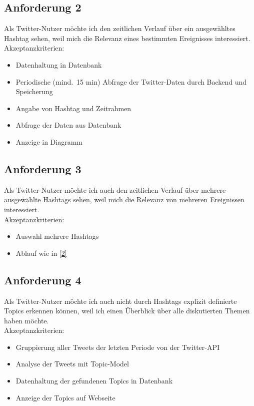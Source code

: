 \documentclass[conference]{IEEEtran}
\begin{document}
\subsection*{Anforderung 2}
\label{2}
Als Twitter-Nutzer möchte ich den zeitlichen Verlauf über ein ausgewähltes Hashtag sehen,
weil mich die Relevanz eines bestimmten Ereignisses interessiert.
\\
Akzeptanzkriterien:
\begin{itemize}
        \item Datenhaltung in Datenbank
        \item Periodische (mind.\ 15 min) Abfrage der Twitter-Daten durch Backend und Speicherung
        \item Angabe von Hashtag und Zeitrahmen
        \item Abfrage der Daten aus Datenbank
        \item Anzeige in Diagramm
\end{itemize}

\subsection*{Anforderung 3}
Als Twitter-Nutzer möchte ich auch den zeitlichen Verlauf über mehrere ausgewählte Hashtags sehen,
weil mich die Relevanz von mehreren Ereignissen interessiert.
\\
Akzeptanzkriterien:
\begin{itemize}
        \item Auswahl mehrere Hashtags
        \item Ablauf wie in \ref*{2}
\end{itemize}

\subsection*{Anforderung 4}
Als Twitter-Nutzer möchte ich auch nicht durch Hashtags explizit definierte Topics erkennen können,
weil ich einen Überblick über alle diskutierten Themen haben möchte.
\\
Akzeptanzkriterien:
\begin{itemize}
        \item Gruppierung aller Tweets der letzten Periode von der Twitter-API
        \item Analyse der Tweets mit Topic-Model
        \item Datenhaltung der gefundenen Topics in Datenbank
        \item Anzeige der Topics auf Webseite
\end{itemize}
\end{document}
